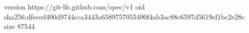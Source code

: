 version https://git-lfs.github.com/spec/v1
oid sha256:dfeced400d9744cca3443a6589757055490f4ab3ac88c6597d5619ef1bc2e28c
size 87544
